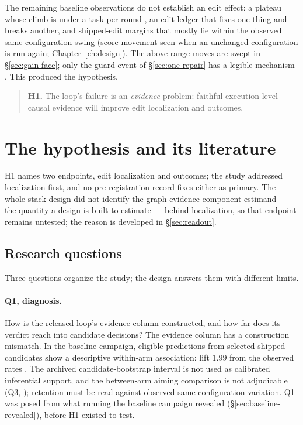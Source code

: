 The remaining baseline observations do not establish an edit effect: a
plateau whose climb is under a task per round , an edit ledger that
fixes one thing and breaks another, and shipped-edit margins that mostly lie
within the observed same-configuration swing (score movement seen when an
unchanged configuration is run again; Chapter~\ref{ch:design}). The
above-range moves are swept in \S\ref{sec:gain-face}; only the guard event of
\S\ref{sec:one-repair} has a legible mechanism . This produced the
hypothesis.

\begin{quote}
\textbf{H1.} The loop's failure is an \emph{evidence} problem: faithful
execution-level causal evidence will improve edit localization and
outcomes.
\end{quote}

\section{The hypothesis and its literature}
\label{sec:hypothesis}


H1 names two endpoints, edit localization and outcomes; the study addressed
localization first, and no pre-registration record fixes either as primary.
The whole-stack design did not identify the graph-evidence component
estimand --- the quantity a design is built to estimate --- behind
localization, so that endpoint remains untested; the reason is developed in
\S\ref{sec:readout}.

\subsection*{Research questions}
\label{sec:research-questions}

Three questions organize the study; the design answers them with different limits.

\paragraph{Q1, diagnosis.}\label{rq:1} How is the released loop's evidence
column constructed, and how far does its verdict reach into candidate
decisions? The evidence column has a construction mismatch. In the
baseline campaign, eligible predictions from selected shipped candidates
show a descriptive within-arm association: lift $1.99$ from the observed
rates . The archived candidate-bootstrap interval is not used as
calibrated inferential support, and the between-arm aiming comparison is not
adjudicable (Q3, ); retention must be read against observed same-configuration variation. Q1 was posed from
what running the baseline campaign revealed
(\S\ref{sec:baseline-revealed}), before H1 existed to test.

